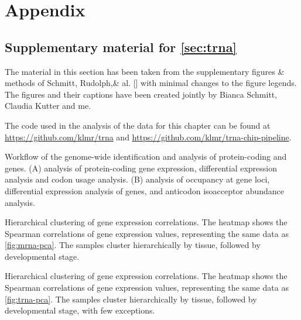 \clearpage
{}
{}
\part*{Appendix}
\label{sec:appendix}

\setcounter{chapter}{0}
\renewcommand\thechapter{\Alph{chapter}}

\chapter{Supplementary material for \texorpdfstring{\cref*{sec:trna}}{chapter 2}}

The material in this section has been taken from the supplementary figures \&
methods of Schmitt, Rudolph,\andothersdelim\& al. [\cite*{Schmitt:2014}] with
minimal changes to the figure legends. The figures and their captions have been
created jointly by Bianca Schmitt, Claudia Kutter and me.

The code used in the analysis of the data for this chapter can be found at
\url{https://github.com/klmr/trna} and
\url{https://github.com/klmr/trna-chip-pipeline}.

\begingroup
\renewcommand*\floatpos{H}

    {Workflow of the genome-wide identification and analysis of protein-coding
    and \trna genes.}
    {(A) \rnaseq analysis of protein-coding gene expression, differential
    expression analysis and codon usage analysis. (B) \chipseq analysis of 
    occupancy at \trna gene loci, differential expression analysis of \trna
    genes, and anticodon isoacceptor abundance analysis.}



    {Hierarchical clustering of \mrna gene expression correlations.}
    {The heatmap shows the Spearman correlations of \mrna gene expression values,
    representing the same data as \cref{fig:mrna-pca}. The samples cluster
    hierarchically by tissue, followed by developmental stage.}

    {Hierarchical clustering of \trna gene expression correlations.}
    {The heatmap shows the Spearman correlations of \trna gene expression values,
    representing the same data as \cref{fig:trna-pca}. The samples cluster
    hierarchically by tissue, followed by developmental stage, with few
    exceptions.}

